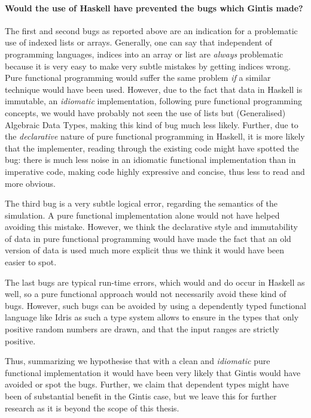 \paragraph{Would the use of Haskell have prevented the bugs which Gintis made?}
The first and second bugs as reported above are an indication for a problematic use of indexed lists or arrays. Generally, one can say that independent of programming languages, indices into an array or list are \textit{always} problematic because it is very easy to make very subtle mistakes by getting indices wrong. Pure functional programming would suffer the same problem \textit{if} a similar technique would have been used. However, due to the fact that data in Haskell is immutable, an \textit{idiomatic} implementation, following pure functional programming concepts, we would have probably not seen the use of lists but (Generalised) Algebraic Data Types, making this kind of bug much less likely. Further, due to the \textit{declarative} nature of pure functional programming in Haskell, it is more likely that the implementer, reading through the existing code might have spotted the bug: there is much less noise in an idiomatic functional implementation than in imperative code, making code highly expressive and concise, thus less to read and more obvious.

The third bug is a very subtle logical error, regarding the semantics of the simulation. A pure functional implementation alone would not have helped avoiding this mistake. However, we think the declarative style and immutability of data in pure functional programming would have made the fact that an old version of data is used much more explicit thus we think it would have been easier to spot.

The last bugs are typical run-time errors, which would and do occur in Haskell as well, so a pure functional approach would not necessarily avoid these kind of bugs. However, such bugs can be avoided by using a dependently typed functional language like Idris \cite{brady_idris_2013} as such a type system allows to ensure in the types that only positive random numbers are drawn, and that the input ranges are strictly positive.

Thus, summarizing we hypothesise that with a clean and \textit{idiomatic} pure functional implementation it would have been very likely that Gintis would have avoided or spot the bugs. Further, we claim that dependent types might have been of substantial benefit in the Gintis case, but we leave this for further research as it is beyond the scope of this thesis. %

